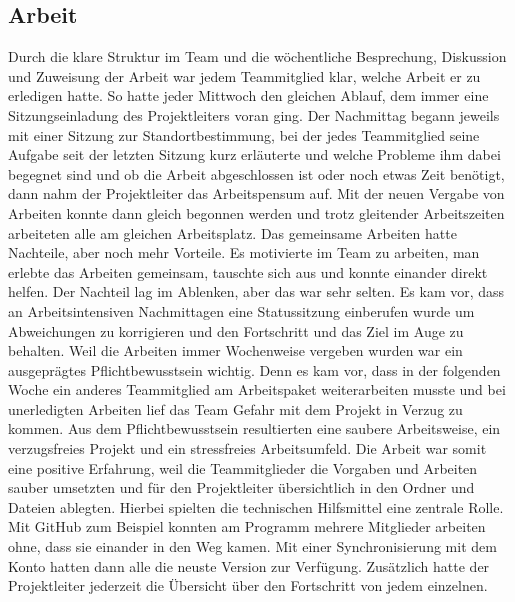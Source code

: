\subsection{Arbeit}
Durch die klare Struktur im Team und die wöchentliche Besprechung, Diskussion und Zuweisung der Arbeit war jedem Teammitglied klar, welche Arbeit er zu erledigen hatte. So hatte jeder Mittwoch den gleichen Ablauf, dem immer eine Sitzungseinladung des Projektleiters voran ging. Der Nachmittag begann jeweils mit einer Sitzung zur Standortbestimmung, bei der jedes Teammitglied seine Aufgabe seit der letzten Sitzung kurz erläuterte und welche Probleme ihm dabei begegnet sind und ob die Arbeit abgeschlossen ist oder noch etwas Zeit benötigt, dann nahm der Projektleiter das Arbeitspensum auf. Mit der neuen Vergabe von Arbeiten konnte dann gleich begonnen werden und trotz gleitender Arbeitszeiten arbeiteten alle am gleichen Arbeitsplatz. Das gemeinsame Arbeiten hatte Nachteile, aber noch mehr Vorteile. Es motivierte im Team zu arbeiten, man erlebte das Arbeiten gemeinsam, tauschte sich aus und konnte einander direkt helfen. Der Nachteil lag im Ablenken, aber das war sehr selten. Es kam vor, dass an Arbeitsintensiven Nachmittagen eine Statussitzung einberufen wurde um Abweichungen zu korrigieren und den Fortschritt und das Ziel im Auge zu behalten. Weil die Arbeiten immer Wochenweise vergeben wurden war ein ausgeprägtes Pflichtbewusstsein wichtig. Denn es kam vor, dass in der folgenden Woche ein anderes Teammitglied am Arbeitspaket weiterarbeiten musste und bei unerledigten Arbeiten lief das Team Gefahr mit dem Projekt in Verzug zu kommen. Aus dem Pflichtbewusstsein resultierten eine saubere Arbeitsweise, ein verzugsfreies Projekt und ein stressfreies Arbeitsumfeld. Die Arbeit war somit eine positive Erfahrung, weil die Teammitglieder die Vorgaben und Arbeiten sauber umsetzten und für den Projektleiter übersichtlich in den Ordner und Dateien ablegten. Hierbei spielten die technischen Hilfsmittel eine zentrale Rolle. Mit GitHub zum Beispiel konnten am Programm mehrere Mitglieder arbeiten ohne, dass sie einander in den Weg kamen. Mit einer Synchronisierung mit dem Konto hatten dann alle die neuste Version zur Verfügung. Zusätzlich hatte der Projektleiter jederzeit die Übersicht über den Fortschritt von jedem einzelnen.

